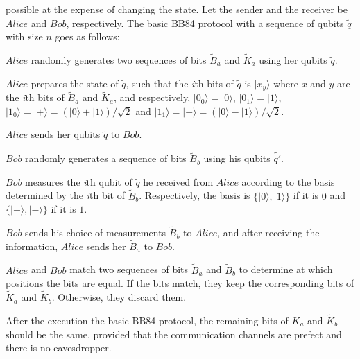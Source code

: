 \documentclass[a4paper,UKenglish,cleveref, autoref]{lipics-v2019}
\begin{document}
possible at the expense of changing the state. Let the sender and the receiver be $Alice$ and $Bob$, respectively. The basic BB84 protocol with a sequence of qubits $\tilde{q}$ with size $n$ goes as follows:
\begin{bracketenumerate}
	\item $Alice$ randomly generates two sequences of bits $\tilde{B}_a$ and $\tilde{K}_a$ using her qubits $\tilde{q}$.
	\item $Alice$ prepares the state of $\tilde{q}$, such that the \textit{i}th bits of $\tilde{q}$ is $|x_{y}\rangle$ where $x$ and $y$ are the \textit{i}th bits of $\tilde{B}_a$ and $\tilde{K}_a$, and respectively,  $|0_0\rangle=|0\rangle$, $|0_1\rangle=|1\rangle$, $|1_0\rangle=|+\rangle=(|0\rangle+|1\rangle)/\sqrt{2}$ and $|1_1\rangle=|-\rangle=(|0\rangle-|1\rangle)/\sqrt{2}$.
	\item $Alice$ sends her qubits $\tilde{q}$ to $Bob$.
	\item $Bob$ randomly generates a sequence of bits $\tilde{B}_b$ using his qubits $\tilde{q'}$.
	\item $Bob$ measures the \textit{i}th qubit of $\tilde{q}$ he received from $Alice$ according to the basis determined by the \textit{i}th bit of $\tilde{B}_b$. Respectively, the basis is $\{|0\rangle,|1\rangle\}$ if it is $0$ and $\{|+\rangle,|-\rangle\}$ if it is $1$.
	\item $Bob$ sends his choice of measurements $\tilde{B}_{b}$ to $Alice$, and after receiving the information, $Alice$ sends her $\tilde{B}_{a}$ to $Bob$.
	\item $Alice$ and $Bob$ match two sequences of bits $\tilde{B}_{a}$ and $\tilde{B}_{b}$ to determine at which positions the bits are equal. If the bits match, they keep the corresponding bits of $\tilde{K}_a$ and $\tilde{K}_b$. Otherwise, they discard them.
\end{bracketenumerate}
After the execution the basic BB84 protocol, the remaining bits of $\tilde{K}_a$ and $\tilde{K}_b$ should be the same, provided that the communication channels are prefect and there is no eavesdropper.
\end{document}
